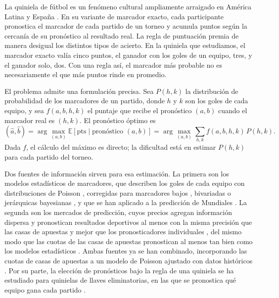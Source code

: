 \documentclass[12pt]{article}
\theoremstyle{plain}
\theoremstyle{remark}
\newcommand{\E}{\mathbb{E}}
\begin{document}
La quiniela de fútbol es un fenómeno cultural ampliamente arraigado
en América Latina y España \citep{aguero2024, lopez2022}.
En su variante de marcador exacto, cada participante pronostica el
marcador de cada partido de un torneo y acumula puntos según la
cercanía de su pronóstico al resultado real.
La regla de puntuación premia de manera desigual los distintos tipos
de acierto.
En la quiniela que estudiamos, el marcador exacto valía cinco puntos,
el ganador con los goles de un equipo, tres, y el ganador solo, dos.
Con una regla así, el marcador más probable no es necesariamente el
que más puntos rinde en promedio.

El problema admite una formulación precisa.
Sea $P(h, k)$ la distribución de probabilidad de los marcadores de un
partido, donde $h$ y $k$ son los goles de cada equipo, y sea
$f(a, b, h, k)$ el puntaje que recibe el pronóstico $(a, b)$ cuando
el marcador real es $(h, k)$.
El pronóstico óptimo es
\begin{equation}
  (\hat{a}, \hat{b})
  = \arg\max_{(a,b)} \E[\text{pts} \mid \text{pronóstico } (a,b)]
  = \arg\max_{(a,b)} \sum_{h,k} f(a, b, h, k) \, P(h, k).
\end{equation}
Dada $f$, el cálculo del máximo es directo; la dificultad está en
estimar $P(h,k)$ para cada partido del torneo.

Dos fuentes de información sirven para esa estimación.
La primera son los modelos estadísticos de marcadores, que describen
los goles de cada equipo con distribuciones de Poisson
\citep{maher1982}, corregidas para marcadores bajos
\citep{dixon1997}, bivariadas \citep{karlis2003} o jerárquicas
bayesianas \citep{baio2010}, y que se han aplicado a la predicción de
Mundiales \citep{groll2015}.
La segunda son los mercados de predicción, cuyos precios agregan
información dispersa \citep{arrow2008} y pronostican resultados
deportivos al menos con la misma precisión que las casas de apuestas
y mejor que los pronosticadores individuales
\citep{spann2009}, del mismo modo que las cuotas de las casas de
apuestas pronostican al menos tan bien como los modelos estadísticos
\citep{forrest2005}.
Ambas fuentes ya se han combinado, incorporando las cuotas de casas
de apuestas a un modelo de Poisson ajustado con datos históricos
\citep{egidi2018}.
Por su parte, la elección de pronósticos bajo la regla de una
quiniela se ha estudiado para quinielas de llaves eliminatorias, en
las que se pronostica qué equipo gana cada partido
\citep{kaplan2001, clair2007}.
\end{document}
